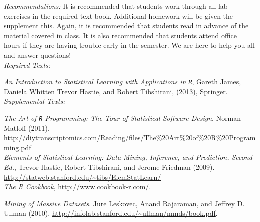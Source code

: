 \documentclass[11pt]{article}
\begin{document}
\emph{Recommendations:} It is recommended that students work through all lab exercises in the required text book. Additional homework will be given the supplement this. Again, it is recommended that students read in advance of the material covered in class. It is also recommended that students attend office hours if they are having trouble early in the semester. We are here to help you all and answer questions! \\


\emph{Required Texts:} 

\emph{An Introduction to Statistical Learning with Applications in \texttt{R}}, Gareth James, Daniela Whitten Trevor Hastie, and Robert Tibshirani, (2013), Springer.\\

\emph{Supplemental Texts:} 


\emph{The Art of \texttt{R} Programming: The Tour of Statistical Software Design}, Norman Matloff (2011). \url{http://diytranscriptomics.com/Reading/files/The%20Art%20of%20R%20Programming.pdf}\\

\emph{Elements of Statistical Learning: Data Mining, Inference, and Prediction, Second Ed.}, Trevor Hastie, Robert Tibshirani, and Jerome Friedman (2009). \url{http://statweb.stanford.edu/~tibs/ElemStatLearn/}\\

\emph{The R Cookbook}, \url{http://www.cookbook-r.com/}.


\emph{Mining of Massive Datasets}. Jure Leskovec, Anand Rajaraman, and Jeffrey D. Ullman (2010). \url{http://infolab.stanford.edu/~ullman/mmds/book.pdf}.


\end{document}
